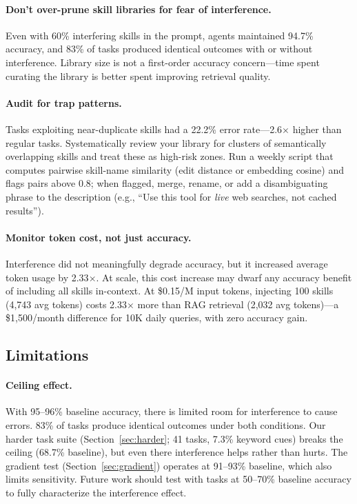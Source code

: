 \documentclass[11pt]{article}
\begin{document}
\paragraph{Don't over-prune skill libraries for fear of interference.}
Even with 60\% interfering skills in the prompt, agents maintained 94.7\% accuracy, and 83\% of tasks produced identical outcomes with or without interference. Library size is not a first-order accuracy concern---time spent curating the library is better spent improving retrieval quality.

\paragraph{Audit for trap patterns.}
Tasks exploiting near-duplicate skills had a 22.2\% error rate---2.6$\times$ higher than regular tasks. Systematically review your library for clusters of semantically overlapping skills and treat these as high-risk zones. Run a weekly script that computes pairwise skill-name similarity (edit distance or embedding cosine) and flags pairs above 0.8; when flagged, merge, rename, or add a disambiguating phrase to the description (e.g., ``Use this tool for \emph{live} web searches, not cached results'').

\paragraph{Monitor token cost, not just accuracy.}
Interference did not meaningfully degrade accuracy, but it increased average token usage by 2.33$\times$. At scale, this cost increase may dwarf any accuracy benefit of including all skills in-context. At \$0.15/M input tokens, injecting 100 skills (4,743 avg tokens) costs 2.33$\times$ more than RAG retrieval (2,032 avg tokens)---a \$1,500/month difference for 10K daily queries, with zero accuracy gain.

\subsection{Limitations}

\paragraph{Ceiling effect.} With 95--96\% baseline accuracy, there is limited room for interference to cause errors. 83\% of tasks produce identical outcomes under both conditions. Our harder task suite (Section~\ref{sec:harder}; 41 tasks, 7.3\% keyword cues) breaks the ceiling (68.7\% baseline), but even there interference helps rather than hurts. The gradient test (Section~\ref{sec:gradient}) operates at 91--93\% baseline, which also limits sensitivity. Future work should test with tasks at 50--70\% baseline accuracy to fully characterize the interference effect.
\end{document}
